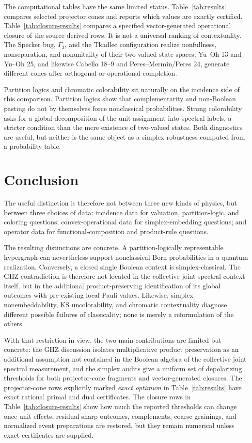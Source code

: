 \documentclass[aps,pra,twocolumn,superscriptaddress,nofootinbib]{revtex4-2}
\begin{document}
The computational tables have the same limited status.  Table~\ref{tab:results} compares selected projector cones and reports which values are exactly certified.  Table~\ref{tab:closure-results} compares a specified vector-generated operational closure of the source-derived rows.  It is not a universal ranking of contextuality.  The Specker bug, $\Gamma_3$, and the Tkadlec configuration realize nonfullness, nonseparation, and nonunitality of their two-valued-state spaces; Yu--Oh 13 and Yu--Oh 25, and likewise Cabello 18--9 and Peres--Mermin/Peres 24, generate different cones after orthogonal or operational completion.

Partition logics and chromatic colorability sit naturally on the incidence side of this comparison.  Partition logics show that complementarity and non-Boolean pasting do not by themselves force nonclassical probabilities.  Strong colorability asks for a global decomposition of the unit assignment into spectral labels, a stricter condition than the mere existence of two-valued states.  Both diagnostics are useful, but neither is the same object as a simplex robustness computed from a probability table.


\section{Conclusion}

The useful distinction is therefore not between three new kinds of physics, but between three choices of data: incidence data for valuation, partition-logic, and coloring questions; convex-operational data for simplex-embedding questions; and operator data for functional-composition and product-rule questions.

The resulting distinctions are concrete.  A partition-logically representable
hypergraph can nevertheless support nonclassical Born probabilities in a
quantum realization.  Conversely, a closed single Boolean context is
simplex-classical.  The GHZ contradiction is therefore not located in the
collective joint spectral context itself, but in the additional
product-preserving identification of its global outcomes with pre-existing
local Pauli values.  Likewise, simplex nonembeddability, KS uncolorability,
and chromatic contextuality diagnose different possible failures of
classicality; none is merely a reformulation of the others.

With that restriction in view, the two main contributions are limited but concrete: the GHZ discussion isolates multiplicative product preservation as an additional assumption not contained in the Boolean algebra of the collective joint spectral measurement, and the simplex audits give a uniform set of depolarizing thresholds for both projector-cone fragments and vector-generated closures.  The projector-cone rows explicitly marked \emph{exact optimum} in Table~\ref{tab:results} have exact rational primal and dual certificates.  The closure rows in Table~\ref{tab:closure-results} show how much the reported thresholds can change once unit effects, residual sharp outcomes, complements, coarse grainings, and normalized event preparations are restored, but they remain numerical unless exact certificates are supplied.
\end{document}
